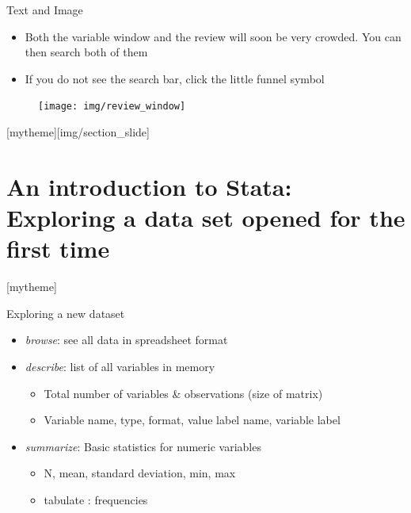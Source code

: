 \documentclass[aspectratio=169]{beamer}
\newcommand{\sectionpic}[2]{
	\setbeamertemplate{section page}[mytheme][#2]
	\section{#1}
	\setbeamertemplate{section page}[mytheme]
}
\begin{document}
\begin{frame}[fragile]{Text and Image}

\begin{multicols}{2}	
	\begin{itemize}
		\item Both the variable window and the review will soon be very crowded. You can then search both of them
		\item If you do not see the search bar, click the little funnel symbol
		
	\end{itemize}
	\begin{figure}
		\centering
		\texttt{[image: img/review\_window]}
	\end{figure}
\end{multicols}
\end{frame}


\sectionpic{An introduction to Stata: \newline Exploring a data set opened for the first time}{img/section_slide}


\begin{frame}{Exploring a new dataset}
\begin{itemize}
\item {\protect\textit{browse}}: see all data in spreadsheet format
\item \textit {describe}: list of all variables in memory
	\begin{itemize}
		\item Total number of variables \& observations (size of matrix)
		\item Variable name, type, format, value label name, variable label
	\end{itemize}
\item \textit {summarize}: Basic statistics for numeric variables
	\begin{itemize}
		\item N, mean, standard deviation, min, max
		\item tabulate : frequencies
	\end{itemize}
\end{itemize}
\end{frame}
\end{document}
